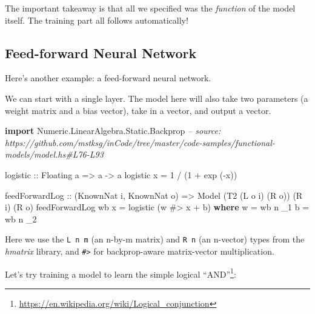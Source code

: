 \documentclass[]{article}
\newenvironment{Shaded}{}{}
\newcommand{\CommentTok}[1]{\textcolor[rgb]{0.38,0.63,0.69}{\textit{#1}}}
\newcommand{\DataTypeTok}[1]{\textcolor[rgb]{0.56,0.13,0.00}{#1}}
\newcommand{\DecValTok}[1]{\textcolor[rgb]{0.25,0.63,0.44}{#1}}
\newcommand{\FunctionTok}[1]{\textcolor[rgb]{0.02,0.16,0.49}{#1}}
\newcommand{\KeywordTok}[1]{\textcolor[rgb]{0.00,0.44,0.13}{\textbf{#1}}}
\newcommand{\NormalTok}[1]{#1}
\newcommand{\OtherTok}[1]{\textcolor[rgb]{0.00,0.44,0.13}{#1}}
\renewcommand{\href}[2]{#2\footnote{\url{#1}}}
\begin{document}
The important takeaway is that all we specified was the \emph{function} of the
model itself. The training part all follows automatically!

\hypertarget{feed-forward-neural-network}{%
\subsection{Feed-forward Neural Network}\label{feed-forward-neural-network}}

Here's another example: a feed-forward neural network.

We can start with a single layer. The model here will also take two parameters
(a weight matrix and a bias vector), take in a vector, and output a vector.

\begin{Shaded}
\begin{Highlighting}[]
\KeywordTok{import} \DataTypeTok{Numeric.LinearAlgebra.Static.Backprop}
\CommentTok{-- source: https://github.com/mstksg/inCode/tree/master/code-samples/functional-models/model.hs#L76-L93}

\OtherTok{logistic ::} \DataTypeTok{Floating}\NormalTok{ a }\OtherTok{=>}\NormalTok{ a }\OtherTok{->}\NormalTok{ a}
\NormalTok{logistic x }\FunctionTok{=} \DecValTok{1} \FunctionTok{/}\NormalTok{ (}\DecValTok{1} \FunctionTok{+}\NormalTok{ exp (}\FunctionTok{-}\NormalTok{x))}

\NormalTok{feedForwardLog}
\OtherTok{    ::}\NormalTok{ (}\DataTypeTok{KnownNat}\NormalTok{ i, }\DataTypeTok{KnownNat}\NormalTok{ o)}
    \OtherTok{=>} \DataTypeTok{Model}\NormalTok{ (}\DataTypeTok{T2}\NormalTok{ (}\DataTypeTok{L}\NormalTok{ o i) (}\DataTypeTok{R}\NormalTok{ o)) (}\DataTypeTok{R}\NormalTok{ i) (}\DataTypeTok{R}\NormalTok{ o)}
\NormalTok{feedForwardLog wb x }\FunctionTok{=}\NormalTok{ logistic (w }\FunctionTok{#>}\NormalTok{ x }\FunctionTok{+}\NormalTok{ b)}
  \KeywordTok{where}
\NormalTok{    w }\FunctionTok{=}\NormalTok{ wb }\FunctionTok{^^.}\NormalTok{ _1}
\NormalTok{    b }\FunctionTok{=}\NormalTok{ wb }\FunctionTok{^^.}\NormalTok{ _2}
\end{Highlighting}
\end{Shaded}

Here we use the \texttt{L\ n\ m} (an n-by-m matrix) and \texttt{R\ n} (an
n-vector) types from the \emph{hmatrix} library, and \texttt{\#\textgreater{}}
for backprop-aware matrix-vector multiplication.

Let's try training a model to learn the simple
\href{https://en.wikipedia.org/wiki/Logical_conjunction}{logical ``AND''}:
\end{document}
